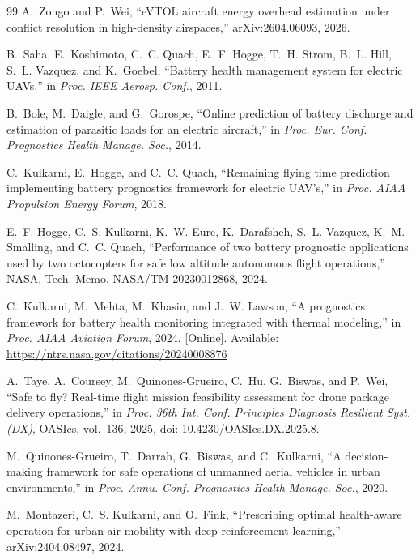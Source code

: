 \documentclass[journal]{IEEEtran}
\begin{document}
\begin{thebibliography}{99}
A.~Zongo and P.~Wei, ``eVTOL aircraft energy overhead estimation under conflict resolution in high-density airspaces,'' arXiv:2604.06093, 2026.

B.~Saha, E.~Koshimoto, C.~C. Quach, E.~F. Hogge, T.~H. Strom, B.~L. Hill, S.~L. Vazquez, and K.~Goebel, ``Battery health management system for electric UAVs,'' in \textit{Proc. IEEE Aerosp. Conf.}, 2011.

B.~Bole, M.~Daigle, and G.~Gorospe, ``Online prediction of battery discharge and estimation of parasitic loads for an electric aircraft,'' in \textit{Proc. Eur. Conf. Prognostics Health Manage. Soc.}, 2014.

C.~Kulkarni, E.~Hogge, and C.~C. Quach, ``Remaining flying time prediction implementing battery prognostics framework for electric UAV's,'' in \textit{Proc. AIAA Propulsion Energy Forum}, 2018.

E.~F. Hogge, C.~S. Kulkarni, K.~W. Eure, K.~Darafsheh, S.~L. Vazquez, K.~M. Smalling, and C.~C. Quach, ``Performance of two battery prognostic applications used by two octocopters for safe low altitude autonomous flight operations,'' NASA, Tech. Memo. NASA/TM-20230012868, 2024.

C.~Kulkarni, M.~Mehta, M.~Khasin, and J.~W. Lawson, ``A prognostics framework for battery health monitoring integrated with thermal modeling,'' in \textit{Proc. AIAA Aviation Forum}, 2024. [Online]. Available: \url{https://ntrs.nasa.gov/citations/20240008876}

A.~Taye, A.~Coursey, M.~Quinones-Grueiro, C.~Hu, G.~Biswas, and P.~Wei, ``Safe to fly? Real-time flight mission feasibility assessment for drone package delivery operations,'' in \textit{Proc. 36th Int. Conf. Principles Diagnosis Resilient Syst. (DX)}, OASIcs, vol.~136, 2025, doi: 10.4230/OASIcs.DX.2025.8.

M.~Quinones-Grueiro, T.~Darrah, G.~Biswas, and C.~Kulkarni, ``A decision-making framework for safe operations of unmanned aerial vehicles in urban environments,'' in \textit{Proc. Annu. Conf. Prognostics Health Manage. Soc.}, 2020.

M.~Montazeri, C.~S. Kulkarni, and O.~Fink, ``Prescribing optimal health-aware operation for urban air mobility with deep reinforcement learning,'' arXiv:2404.08497, 2024.


\end{thebibliography}
\end{document}
